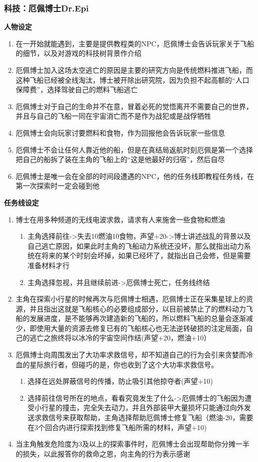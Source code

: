 \documentclass{ctexart}
\begin{document}
			\subsubsection{科技：厄佩博士Dr.Epi}
			\textbf{人物设定} 
			\begin{enumerate}
				\item 在一开始就能遇到，主要是提供教程类的NPC，厄佩博士会告诉玩家关于飞船的细节，以及对游戏的科技树背景作介绍
				\item 厄佩博士加入这场太空逃亡的原因是主要的研究方向是传统燃料推进飞船，而这种飞船已经被全线淘汰，博士被开除出研究院，因为负担不起高额的“人口保障费”，选择驾驶自己的燃料飞船逃亡
				\item 厄佩博士对于自己的生命并不在意，冒着必死的觉悟离开不需要自己的世界，并且与自己的飞船一同在宇宙消亡而不是作为战犯或是战俘牺牲
				\item 厄佩博士会向玩家讨要燃料和食物，作为回报他会告诉玩家一些信息
				\item 厄佩博士不会让任何人靠近他的船，但是在真结局返航时刻厄佩是第一个选择把自己的船拆了装在主角的飞船上的“这是他最好的归宿”，然后自尽
				\item 厄佩博士是唯一会在全部的时间段遭遇的NPC，他的任务线即教程任务线，在第一次探索时一定会碰到他
			\end{enumerate}
			\textbf{任务线设定}
			\begin{enumerate}
				\item 博士在用多种频道的无线电波求救，请求有人来施舍一些食物和燃油
					\begin{enumerate}
					\item 主角选择前往->失去10燃油10食物，声望+20->博士讲述战乱的背景以及自己逃亡原因，如果此时主角的飞船动力系统还没坏，那么就指出动力系统在将来的某个时刻会坏掉，如果已经坏了，就指出自己会修，但是需要准备材料才行
					\item 主角选择忽视，并且继续前进->厄佩博士死亡，任务线终结 
					\end{enumerate}
				\item 主角在探索小行星的时候再次与厄佩博士相遇，厄佩博士正在采集星球上的资源，并且指出这就是飞船核心的必要组成部分，以目前被禁止了的燃料动力飞船的发展进度，是不能够再次建造新的飞船的，所以燃料飞船的总量会逐渐减少，即使用大量的资源去修复已有的飞船核心也无法逆转破损的注定局面，自己的逃亡之旅终将以冰冷的宇宙空间作结(声望+20，燃油+10）
				\item 厄佩博士向周围发出了大功率求救信号，却不知道自己的行为会引来贪婪而冷血的星际旅行者，但碰巧的是，你也收到了这个大功率求救信号。
					\begin{enumerate}
					\item 选择在远处屏蔽信号的传播，防止吸引其他掠夺者(声望+10)
					\item 选择前往信号所在的地点，看看究竟发生了什么->厄佩博士的飞船因为遭受小行星的撞击，完全失去动力，并且外部装甲大量损坏只能通过向外发送求救信号来获取帮助，主角选择帮助厄佩博士修复飞船（燃油-20，需要在3个回合内进行探索找到修复飞船所需的材料，声望+10)
					\end{enumerate}
				\item 当主角触发危险度为3及以上的探索事件时，厄佩博士会出现帮助你分摊一半的损失，以此报答你的救命之恩，向主角的行为表示感谢
			\end{enumerate}
\end{document}
